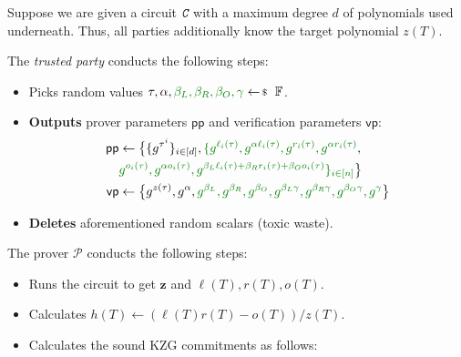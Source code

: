 \documentclass[../../book.tex]{subfiles}
\begin{document}
\begin{tcolorbox}[title=Attempt \#3: Sound SNARK Protocol,
    breakable,
    colback=blue!5!white,
    colframe=blue!75!black,
    colbacktitle=blue!25!white,
    coltitle=blue!20!black,
    fonttitle=\bfseries,
    boxrule=1.25pt,
    subtitle style={boxrule=0pt,
    colback=blue!20!white,
    colupper=blue!75!gray} ]

    Suppose we are given a circuit $\textit{\texttt{C}}$ with a maximum degree $d$ of polynomials used underneath. Thus, all parties additionally know the target polynomial $z(T)$.

    The \emph{trusted party} conducts the following steps:
    \begin{itemize}[label=]
        \item Picks random values $\tau, \alpha, \textcolor{green!50!black}{\beta_L, \beta_R, \beta_O, \gamma} \leftarrowS \mathbb{F}$.
        \item \textbf{Outputs} prover parameters $\mathsf{pp}$ and verification parameters $\mathsf{vp}$:
        \begin{align*}
            \mathsf{pp} &\gets \big\{\{g^{\tau^i}\}_{i \in [d]}, \textcolor{green!50!black}{\{g^{\ell_i(\tau)}, g^{\alpha \ell_i(\tau)}, g^{r_i(\tau)}, g^{\alpha r_i(\tau)}}, \\ 
            & \textcolor{green!50!black}{g^{o_i(\tau)}, g^{\alpha o_i(\tau)}, g^{\beta_L\ell_i(\tau)+\beta_Rr_i(\tau)+\beta_Oo_i(\tau)}\}_{i \in [n]}}\big\} \\
            \mathsf{vp} &\gets \big\{ g^{z(\tau)}, g^{\alpha}, \textcolor{green!50!black}{g^{\beta_L}, g^{\beta_R}, g^{\beta_O}, g^{\beta_L\gamma}, g^{\beta_R\gamma}, g^{\beta_O\gamma}, g^{\gamma}} \big\}
        \end{align*}
        \item \textbf{Deletes} aforementioned random scalars (toxic waste).
    \end{itemize}
    The prover $\mathcal{P}$ conducts the following steps:
    \begin{itemize}[label=]
        \item Runs the circuit to get $\mathbf{z}$ and $\ell(T),r(T),o(T)$.
        \item Calculates $h(T) \gets (\ell(T)r(T) - o(T))\big/ z(T)$.
        \item Calculates the sound KZG commitments as follows: 
        \begin{align*}

\end{align*}
\end{itemize}
\end{tcolorbox}
\end{document}
